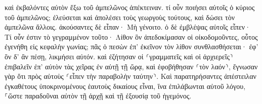 \documentclass{openreader}
\begin{document}
καὶ ἐκβαλόντες αὐτὸν ἔξω τοῦ ἀμπελῶνος ἀπέκτειναν. τί οὖν ποιήσει αὐτοῖς ὁ κύριος τοῦ ἀμπελῶνος; 
ἐλεύσεται καὶ ἀπολέσει τοὺς γεωργοὺς τούτους, καὶ δώσει τὸν ἀμπελῶνα ἄλλοις. ἀκούσαντες δὲ εἶπαν· Μὴ γένοιτο. 
ὁ δὲ ἐμβλέψας αὐτοῖς εἶπεν· Τί οὖν ἐστιν τὸ γεγραμμένον τοῦτο· Λίθον ὃν ἀπεδοκίμασαν οἱ οἰκοδομοῦντες, οὗτος ἐγενήθη εἰς κεφαλὴν γωνίας; 
πᾶς ὁ πεσὼν ἐπ’ ἐκεῖνον τὸν λίθον συνθλασθήσεται· ἐφ’ ὃν δ’ ἂν πέσῃ, λικμήσει αὐτόν. 
καὶ ἐζήτησαν οἱ ⸂γραμματεῖς καὶ οἱ ἀρχιερεῖς⸃ ἐπιβαλεῖν ἐπ’ αὐτὸν τὰς χεῖρας ἐν αὐτῇ τῇ ὥρᾳ, καὶ ἐφοβήθησαν ⸂τὸν λαόν⸃, ἔγνωσαν γὰρ ὅτι πρὸς αὐτοὺς ⸂εἶπεν τὴν παραβολὴν ταύτην⸃. 
Καὶ παρατηρήσαντες ἀπέστειλαν ἐγκαθέτους ὑποκρινομένους ἑαυτοὺς δικαίους εἶναι, ἵνα ἐπιλάβωνται αὐτοῦ λόγου, ⸀ὥστε παραδοῦναι αὐτὸν τῇ ἀρχῇ καὶ τῇ ἐξουσίᾳ τοῦ ἡγεμόνος. 
\end{document}
